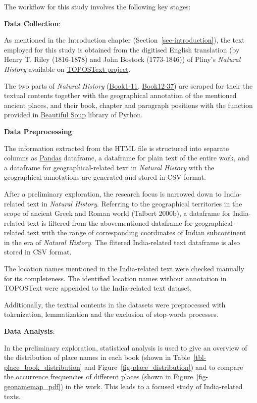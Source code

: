 \documentclass[
  12pt,
]{article}
\begin{document}
The workflow for this study involves the following key stages:

\textbf{Data Collection}:

As mentioned in the Introduction chapter
(Section~\ref{sec-introduction}), the text employed for this study is
obtained from the digitised English translation (by Henry T. Riley
(1816-1878) and John Bostock (1773-1846)) of Pliny's \emph{Natural
History} available on \href{https://topostext.org/the-project}{TOPOSText
project}.

The two parts of \emph{Natural History}
(\href{https://topostext.org/work/148}{Book1-11},
\href{https://topostext.org/work/153}{Book12-37}) are scraped for their
the textual contents together with the geographical annotation of the
mentioned ancient places, and their book, chapter and paragraph
positions with the function provided in
\href{https://www.crummy.com/software/BeautifulSoup/bs4/doc/}{Beautiful
Soup} library of Python.

\textbf{Data Preprocessing}:

The information extracted from the HTML file is structured into separate
columns as \href{https://pandas.pydata.org/}{Pandas} dataframe, a
dataframe for plain text of the entire work, and a dataframe for
geographical-related text in \emph{Natural History} with the
geographical annotations are generated and stored in CSV format.

After a preliminary exploration, the research focus is narrowed down to
India-related text in \emph{Natural History}. Referring to the
geographical territories in the scope of ancient Greek and Roman world
(Talbert 2000b), a dataframe for India-related text is filtered from the
abovementioned dataframe for geographical-related text with the range of
corresponding coordinates of Indian subcontinent in the era of
\emph{Natural History}. The flitered India-related text dataframe is
also stored in CSV format.

The location names mentioned in the India-related text were checked
manually for its completeness. The identified location names without
annotation in TOPOSText were appended to the India-related text dataset.

Additionally, the textual contents in the datasets were preprocessed
with tokenization, lemmatization and the exclusion of stop-words
processes.

\textbf{Data Analysis}:

In the preliminary exploration, statistical analysis is used to give an
overview of the distribution of place names in each book (shown in
Table~\ref{tbl-place_book_distribution} and
Figure~\ref{fig-place_distribution}) and to compare the occurrence
frequencies of different places (shown in
Figure~\ref{fig-geonamemap_pdf}) in the work. This leads to a focused
study of India-related texts.
\end{document}
